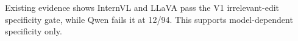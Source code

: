 Existing evidence shows InternVL and LLaVA pass the V1 irrelevant-edit specificity gate, while Qwen fails it at 12/94. This supports model-dependent specificity only.
